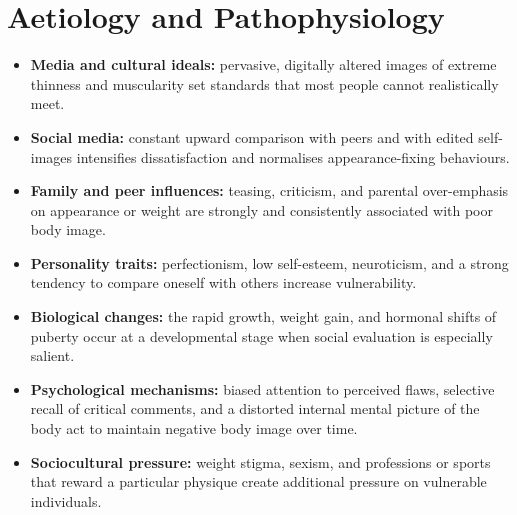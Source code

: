 \section*{Aetiology and Pathophysiology}
\begin{itemize}
    \item \textbf{Media and cultural ideals:} pervasive, digitally altered images of extreme thinness and muscularity set standards that most people cannot realistically meet.
    \item \textbf{Social media:} constant upward comparison with peers and with edited self-images intensifies dissatisfaction and normalises appearance-fixing behaviours.
    \item \textbf{Family and peer influences:} teasing, criticism, and parental over-emphasis on appearance or weight are strongly and consistently associated with poor body image.
    \item \textbf{Personality traits:} perfectionism, low self-esteem, neuroticism, and a strong tendency to compare oneself with others increase vulnerability.
    \item \textbf{Biological changes:} the rapid growth, weight gain, and hormonal shifts of puberty occur at a developmental stage when social evaluation is especially salient.
    \item \textbf{Psychological mechanisms:} biased attention to perceived flaws, selective recall of critical comments, and a distorted internal mental picture of the body act to maintain negative body image over time.
    \item \textbf{Sociocultural pressure:} weight stigma, sexism, and professions or sports that reward a particular physique create additional pressure on vulnerable individuals.
\end{itemize}

